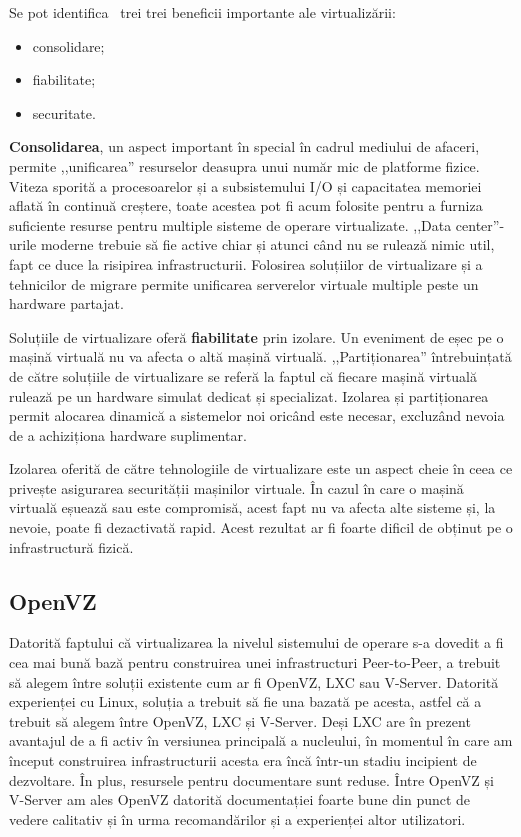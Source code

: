 Se pot identifica~\cite{best-damn-virt} trei trei beneficii importante ale
virtualizării:

\begin{itemize}
  \item consolidare;
  \item fiabilitate;
  \item securitate.
\end{itemize}

\textbf{Consolidarea}, un aspect important în special în cadrul mediului
de afaceri, permite ,,unificarea'' resurselor deasupra unui număr mic
de platforme fizice. Viteza sporită a procesoarelor și a subsistemului I/O
și capacitatea memoriei aflată în continuă creștere, toate acestea pot
fi acum folosite pentru a furniza suficiente resurse pentru multiple
sisteme de operare virtualizate. ,,Data center''-urile moderne trebuie
să fie active chiar și atunci când nu se rulează nimic util, fapt ce
duce la risipirea infrastructurii. Folosirea soluțiilor de virtualizare și
a tehnicilor de migrare permite unificarea serverelor virtuale multiple
peste un hardware partajat.

Soluțiile de virtualizare oferă \textbf{fiabilitate} prin izolare. Un
eveniment de eșec pe o mașină virtuală nu va afecta o altă mașină virtuală.
,,Partiționarea'' întrebuințată de către soluțiile de virtualizare se
referă la faptul că fiecare mașină virtuală rulează pe un hardware simulat
dedicat și specializat. Izolarea și partiționarea permit alocarea dinamică
a sistemelor noi oricând este necesar, excluzând nevoia de a achiziționa
hardware suplimentar.

Izolarea oferită de către tehnologiile de virtualizare este un aspect cheie
în ceea ce privește asigurarea securității mașinilor virtuale. În cazul
în care o mașină virtuală eșuează sau este compromisă, acest fapt nu va
afecta alte sisteme și, la nevoie, poate fi dezactivată rapid. Acest
rezultat ar fi foarte dificil de obținut pe o infrastructură fizică.

\subsection{OpenVZ}

Datorită faptului că virtualizarea la nivelul sistemului de operare s-a
dovedit a fi cea mai bună bază pentru construirea unei infrastructuri
Peer-to-Peer, a trebuit să alegem între soluții existente cum ar fi
OpenVZ, LXC sau V-Server. Datorită experienței cu Linux, soluția a trebuit
să fie una bazată pe acesta, astfel că a trebuit să alegem între OpenVZ,
LXC și V-Server. Deși LXC are în prezent avantajul de a fi activ în versiunea
principală a nucleului, în momentul în care am început construirea
infrastructurii acesta era încă într-un stadiu incipient de dezvoltare.
În plus, resursele pentru documentare sunt reduse. Între OpenVZ și V-Server
am ales OpenVZ datorită documentației foarte bune din punct de vedere
calitativ și în urma recomandărilor și a experienței altor utilizatori.

